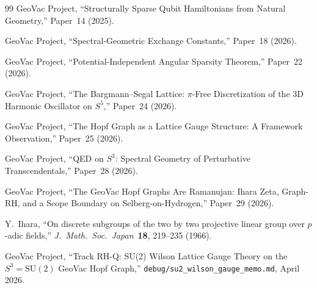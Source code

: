 \documentclass[11pt]{article}
\begin{document}
\begin{thebibliography}{99}
GeoVac Project, ``Structurally Sparse Qubit Hamiltonians from Natural
Geometry,'' Paper~14 (2025).

GeoVac Project, ``Spectral-Geometric Exchange Constants,'' Paper~18
(2026).

GeoVac Project, ``Potential-Independent Angular Sparsity Theorem,''
Paper~22 (2026).

GeoVac Project, ``The Bargmann--Segal Lattice: $\pi$-Free
Discretization of the 3D Harmonic Oscillator on $S^5$,'' Paper~24
(2026).

GeoVac Project, ``The Hopf Graph as a Lattice Gauge Structure: A
Framework Observation,'' Paper~25 (2026).

GeoVac Project, ``QED on $S^3$: Spectral Geometry of Perturbative
Transcendentals,'' Paper~28 (2026).

GeoVac Project, ``The GeoVac Hopf Graphs Are Ramanujan: Ihara Zeta,
Graph-RH, and a Scope Boundary on Selberg-on-Hydrogen,'' Paper~29
(2026).

Y.~Ihara, ``On discrete subgroups of the two by two projective linear
group over $p$-adic fields,''
\textit{J.~Math.~Soc.~Japan}\ \textbf{18}, 219--235 (1966).

GeoVac Project, ``Track RH-Q: SU(2) Wilson Lattice Gauge Theory on
the $S^3 = \mathrm{SU}(2)$ GeoVac Hopf Graph,''
\texttt{debug/su2\_wilson\_gauge\_memo.md}, April 2026.

\end{thebibliography}
\end{document}
